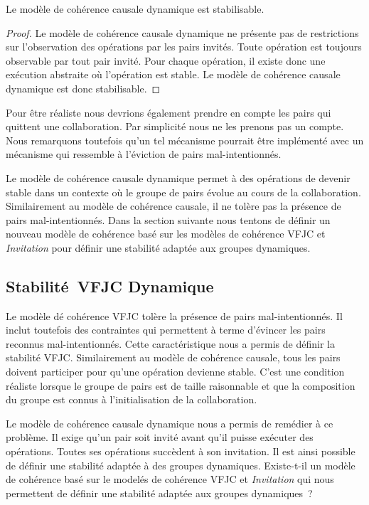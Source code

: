 \begin{theorem}\label{th:stabilizable-dyn-causal}
Le modèle de cohérence causale dynamique est stabilisable.
\end{theorem}

\begin{proof}
Le modèle de cohérence causale dynamique ne présente pas de restrictions sur l'observation des opérations par les pairs invités.
Toute opération est toujours observable par tout pair invité.
Pour chaque opération, il existe donc une exécution abstraite où l'opération est stable.
Le modèle de cohérence causale dynamique est donc stabilisable.
\end{proof}

Pour être réaliste nous devrions également prendre en compte les pairs qui quittent une collaboration.
Par simplicité nous ne les prenons pas un compte.
Nous remarquons toutefois qu'un tel mécanisme pourrait être implémenté avec un mécanisme qui ressemble à l'éviction de pairs mal-intentionnés.

Le modèle de cohérence causale dynamique permet à des opérations de devenir stable dans un contexte où le groupe de pairs évolue au cours de la collaboration.
Similairement au modèle de cohérence causale, il ne tolère pas la présence de pairs mal-intentionnés.
Dans la section suivante nous tentons de définir un nouveau modèle de cohérence basé sur les modèles de cohérence \acs{VFJC} et \emph{Invitation} pour définir une stabilité adaptée aux groupes dynamiques.


\subsection{Stabilité~\acl{VFJC} Dynamique}\label{subsec:dvfjcs}

Le modèle dé cohérence \ac{VFJC} tolère la présence de pairs mal-intentionnés.
Il inclut toutefois des contraintes qui permettent à terme d'évincer les pairs reconnus mal-intentionnés.
Cette caractéristique nous a permis de définir la stabilité \ac{VFJC}.
Similairement au modèle de cohérence causale, tous les pairs doivent participer pour qu'une opération devienne stable.
C'est une condition réaliste lorsque le groupe de pairs est de taille raisonnable et que la composition du groupe est connus à l'initialisation de la collaboration.

Le modèle de cohérence causale dynamique nous a permis de remédier à ce problème.
Il exige qu'un pair soit invité avant qu'il puisse exécuter des opérations.
Toutes ses opérations succèdent à son invitation.
Il est ainsi possible de définir une stabilité adaptée à des groupes dynamiques.
Existe-t-il un modèle de cohérence basé sur le modelés de cohérence \acs{VFJC} et \emph{Invitation} qui nous permettent de définir une stabilité adaptée aux groupes dynamiques~?

